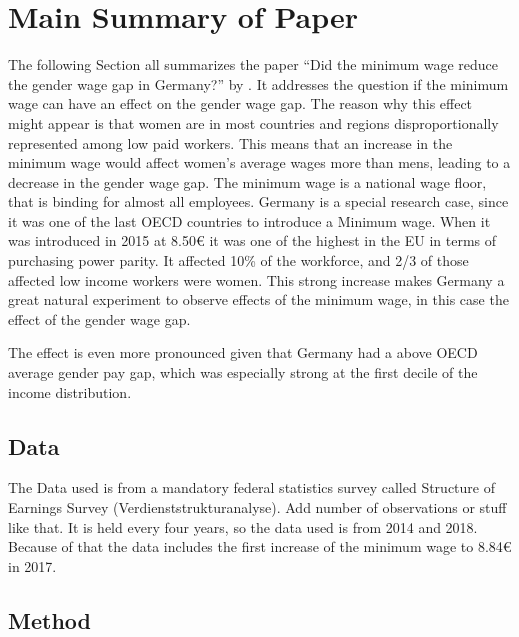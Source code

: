 \documentclass[12pt,draft,a4paper]{article}
\begin{document}
\section{Main Summary of Paper}


The following Section all summarizes the paper “Did the minimum wage reduce the gender wage gap in Germany?” by \citet{CALIENDO22}. It addresses the question if the minimum wage can have an effect on the gender wage gap. The reason why this effect might appear is that women are in most countries and regions disproportionally represented among low paid workers. \citep{kahn2015wage}
This means that an increase in the minimum wage would affect women's average wages more than mens, leading to a decrease in the gender wage gap.
The minimum wage is a national wage floor, that is binding for almost all employees. Germany is a special research case, since it was one of the last OECD countries to introduce a Minimum wage. When it was introduced in 2015 at 8.50€ it was one of the highest in the EU in terms of purchasing power parity. It affected 10\% of the workforce, and 2/3 of those affected low income workers were women.  This strong increase makes Germany a great natural experiment to observe effects of the minimum wage, in this case the effect of the gender wage gap. 

The effect is even more pronounced given that Germany had a above OECD average gender pay gap, which was especially strong at the first decile of the income distribution. 
\subsection{Data}
The Data used is from a mandatory federal statistics survey called Structure of Earnings Survey (Verdienststrukturanalyse). 
Add number of observations or stuff like that.
It is held every four years, so the data used is from 2014 and 2018. Because of that the data includes the first increase of the minimum wage to 8.84€ in 2017.


\subsection{Method}
\end{document}
